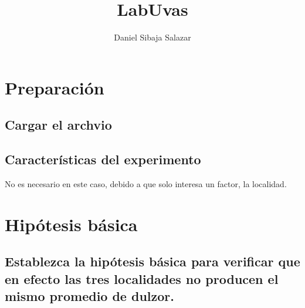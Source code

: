 \documentclass[
]{article}
\title{LabUvas}
\author{Daniel Sibaja Salazar}
\date{}
\newenvironment{Shaded}{\begin{snugshade}}{\end{snugshade}}
\newcommand{\FunctionTok}[1]{\textcolor[rgb]{0.13,0.29,0.53}{\textbf{#1}}}
\newcommand{\NormalTok}[1]{#1}
\newcommand{\OtherTok}[1]{\textcolor[rgb]{0.56,0.35,0.01}{#1}}
\newcommand{\SpecialCharTok}[1]{\textcolor[rgb]{0.81,0.36,0.00}{\textbf{#1}}}
\newcommand{\StringTok}[1]{\textcolor[rgb]{0.31,0.60,0.02}{#1}}
\begin{document}
\maketitle

{
\setcounter{tocdepth}{2}
\tableofcontents
}
\hypertarget{preparaciuxf3n}{%
\section{Preparación}\label{preparaciuxf3n}}

\hypertarget{cargar-el-archvio}{%
\subsection{Cargar el archvio}\label{cargar-el-archvio}}

\begin{Shaded}
\end{Shaded}

\hypertarget{caracteruxedsticas-del-experimento}{%
\subsection{Características del
experimento}\label{caracteruxedsticas-del-experimento}}

No es necesario en este caso, debido a que solo interesa un factor, la
localidad.

\hypertarget{hipuxf3tesis-buxe1sica}{%
\section{Hipótesis básica}\label{hipuxf3tesis-buxe1sica}}

\hypertarget{establezca-la-hipuxf3tesis-buxe1sica-para-verificar-que-en-efecto-las-tres-localidades-no-producen-el-mismo-promedio-de-dulzor.}{%
\subsection{Establezca la hipótesis básica para verificar que en efecto
las tres localidades no producen el mismo promedio de
dulzor.}\label{establezca-la-hipuxf3tesis-buxe1sica-para-verificar-que-en-efecto-las-tres-localidades-no-producen-el-mismo-promedio-de-dulzor.}}
\end{document}
